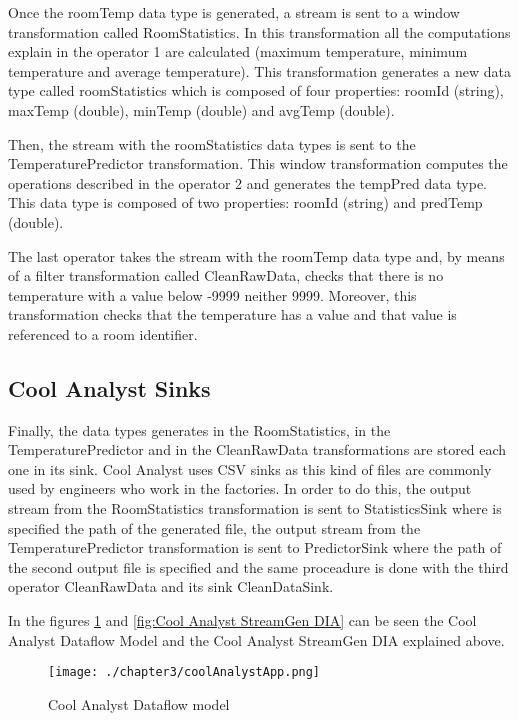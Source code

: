 Once the roomTemp data type is generated, a stream is sent to a window transformation called RoomStatistics. In this transformation all the computations explain in the operator 1 are calculated (maximum temperature, minimum temperature and average temperature). This transformation generates a new data type called roomStatistics which is composed of four properties: roomId (string), maxTemp (double), minTemp (double) and avgTemp (double).

Then, the stream with the roomStatistics data types is sent to the TemperaturePredictor transformation. This window transformation computes the operations described in the operator 2 and generates the tempPred data type. This data type is composed of two properties: roomId (string) and predTemp (double).

The last operator takes the stream with the roomTemp data type and, by means of a filter transformation called CleanRawData, checks that there is no temperature with a value below -9999 neither 9999. Moreover, this transformation checks that the temperature has a value and that value is referenced to a room identifier.

\subsection{Cool Analyst Sinks}

Finally, the data types generates in the RoomStatistics, in the TemperaturePredictor and in the CleanRawData transformations are stored each one in its sink. Cool Analyst uses CSV sinks as this kind of files are commonly used by engineers who work in the factories. In order to do this, the output stream from the RoomStatistics transformation is sent to StatisticsSink where is specified the path of the generated file, the output stream from the TemperaturePredictor transformation is sent to PredictorSink where the path of the second output file is specified and the same proceadure is done with the third operator CleanRawData and its sink CleanDataSink.

In the figures \ref{fig:Cool Analyst Dataflow model} and \ref{fig:Cool Analyst StreamGen DIA} can be seen the Cool Analyst Dataflow Model and the Cool Analyst StreamGen DIA explained above.

\begin{figure}
\centering
{\texttt{[image: ./chapter3/coolAnalystApp.png]}}
\caption{Cool Analyst Dataflow model}
\label{fig:Cool Analyst Dataflow model}
\end{figure}

